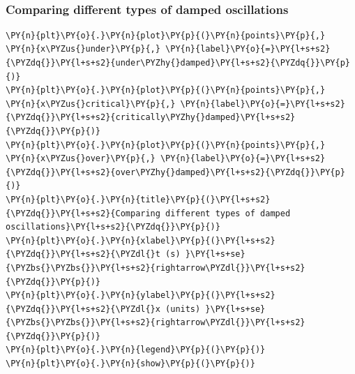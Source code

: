     \begin{center}
    \end{center}
    { \hspace*{\fill} \\}
    
    \hypertarget{comparing-different-types-of-damped-oscillations}{%
\subsubsection{Comparing different types of damped
oscillations}\label{comparing-different-types-of-damped-oscillations}}

    \begin{tcolorbox}[breakable, size=fbox, boxrule=1pt, pad at break*=1mm,colback=cellbackground, colframe=cellborder]
\begin{Verbatim}[commandchars=\\\{\}]
\PY{n}{plt}\PY{o}{.}\PY{n}{plot}\PY{p}{(}\PY{n}{points}\PY{p}{,} \PY{n}{x\PYZus{}under}\PY{p}{,} \PY{n}{label}\PY{o}{=}\PY{l+s+s2}{\PYZdq{}}\PY{l+s+s2}{under\PYZhy{}damped}\PY{l+s+s2}{\PYZdq{}}\PY{p}{)}
\PY{n}{plt}\PY{o}{.}\PY{n}{plot}\PY{p}{(}\PY{n}{points}\PY{p}{,} \PY{n}{x\PYZus{}critical}\PY{p}{,} \PY{n}{label}\PY{o}{=}\PY{l+s+s2}{\PYZdq{}}\PY{l+s+s2}{critically\PYZhy{}damped}\PY{l+s+s2}{\PYZdq{}}\PY{p}{)}
\PY{n}{plt}\PY{o}{.}\PY{n}{plot}\PY{p}{(}\PY{n}{points}\PY{p}{,} \PY{n}{x\PYZus{}over}\PY{p}{,} \PY{n}{label}\PY{o}{=}\PY{l+s+s2}{\PYZdq{}}\PY{l+s+s2}{over\PYZhy{}damped}\PY{l+s+s2}{\PYZdq{}}\PY{p}{)}
\PY{n}{plt}\PY{o}{.}\PY{n}{title}\PY{p}{(}\PY{l+s+s2}{\PYZdq{}}\PY{l+s+s2}{Comparing different types of damped oscillations}\PY{l+s+s2}{\PYZdq{}}\PY{p}{)}
\PY{n}{plt}\PY{o}{.}\PY{n}{xlabel}\PY{p}{(}\PY{l+s+s2}{\PYZdq{}}\PY{l+s+s2}{\PYZdl{}t (s) }\PY{l+s+se}{\PYZbs{}\PYZbs{}}\PY{l+s+s2}{rightarrow\PYZdl{}}\PY{l+s+s2}{\PYZdq{}}\PY{p}{)}
\PY{n}{plt}\PY{o}{.}\PY{n}{ylabel}\PY{p}{(}\PY{l+s+s2}{\PYZdq{}}\PY{l+s+s2}{\PYZdl{}x (units) }\PY{l+s+se}{\PYZbs{}\PYZbs{}}\PY{l+s+s2}{rightarrow\PYZdl{}}\PY{l+s+s2}{\PYZdq{}}\PY{p}{)}
\PY{n}{plt}\PY{o}{.}\PY{n}{legend}\PY{p}{(}\PY{p}{)}
\PY{n}{plt}\PY{o}{.}\PY{n}{show}\PY{p}{(}\PY{p}{)}
\end{Verbatim}
\end{tcolorbox}

    \begin{center}
    \end{center}
    { \hspace*{\fill} \\}
    
